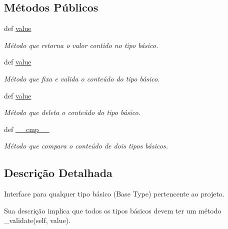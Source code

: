\subsection*{Métodos Públicos}
\begin{DoxyCompactItemize}
\item 
def \hyperlink{classELO_1_1BaseUnit_1_1IfBaseType_ae4974528321f9314afd17c3da0e9d676}{value}
\begin{DoxyCompactList}\small\item\em Método que retorna o valor contido no tipo básico. \end{DoxyCompactList}\item 
def \hyperlink{classELO_1_1BaseUnit_1_1IfBaseType_ae4974528321f9314afd17c3da0e9d676}{value}
\begin{DoxyCompactList}\small\item\em Método que fixa e valida o conteúdo do tipo básico. \end{DoxyCompactList}\item 
def \hyperlink{classELO_1_1BaseUnit_1_1IfBaseType_ae4974528321f9314afd17c3da0e9d676}{value}
\begin{DoxyCompactList}\small\item\em Método que deleta o conteúdo do tipo básico. \end{DoxyCompactList}\item 
def \hyperlink{classELO_1_1BaseUnit_1_1IfBaseType_a69c338f6f1574bd3524e9d59ebc17a7c}{\-\_\-\-\_\-cmp\-\_\-\-\_\-}
\begin{DoxyCompactList}\small\item\em Método que compara o conteúdo de dois tipos básicos. \end{DoxyCompactList}\end{DoxyCompactItemize}


\subsection{Descrição Detalhada}
Interface para qualquer tipo básico (Base Type) pertencente ao projeto. 

Sua descrição implica que todos os tipos básicos devem ter um método \-\_\-validate(self, value). 

